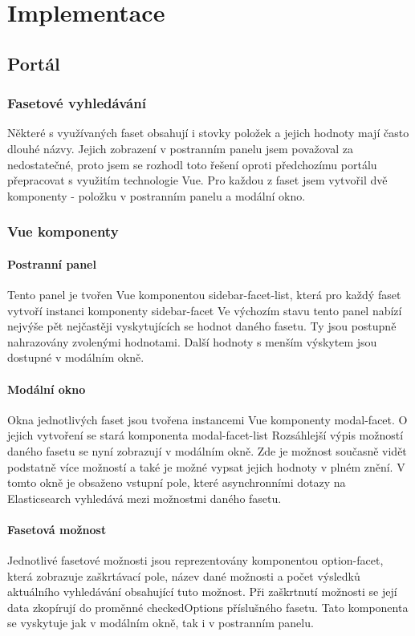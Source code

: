 \chapter{Implementace}

\section{Portál}

\subsection{Fasetové vyhledávání}
Některé s využívaných faset obsahují i stovky položek a jejich hodnoty mají často dlouhé názvy. Jejich zobrazení v postranním panelu jsem považoval za nedostatečné, proto jsem se rozhodl toto řešení oproti předchozímu portálu přepracovat s využitím technologie Vue. Pro každou z faset jsem vytvořil dvě komponenty - položku v postranním panelu a modální okno.

\subsection{Vue komponenty}

\subsubsection{Postranní panel}
Tento panel je tvořen Vue komponentou sidebar-facet-list, která pro každý faset vytvoří instanci komponenty sidebar-facet
Ve výchozím stavu tento panel nabízí nejvýše pět nejčastěji vyskytujících se hodnot daného fasetu. Ty jsou postupně nahrazovány zvolenými hodnotami. Další hodnoty s menším výskytem jsou dostupné v modálním okně.

\subsubsection*{Modální okno}
Okna jednotlivých faset jsou tvořena instancemi Vue komponenty modal-facet. O jejich vytvoření se stará komponenta modal-facet-list
Rozsáhlejší výpis možností daného fasetu se nyní zobrazují v modálním okně. Zde je možnost současně vidět podstatně více možností a také je možné vypsat jejich hodnoty v plném znění. V tomto okně je obsaženo vstupní pole, které asynchronními dotazy na Elasticsearch vyhledává mezi možnostmi daného fasetu.

\subsubsection*{Fasetová možnost}
Jednotlivé fasetové možnosti jsou reprezentovány komponentou option-facet, která zobrazuje zaškrtávací pole, název dané možnosti a počet výsledků aktuálního vyhledávání obsahující tuto možnost. Při zaškrtnutí možnosti se její data zkopírují do proměnné checkedOptions příslušného fasetu. Tato komponenta se vyskytuje jak v modálním okně, tak i v postranním panelu.


